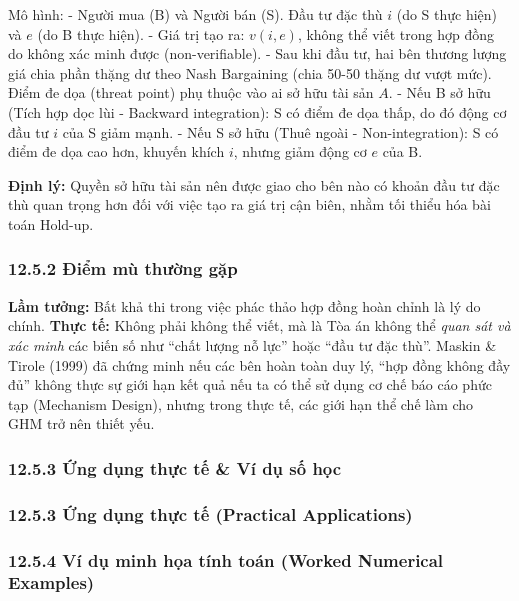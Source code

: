 \documentclass[
]{article}
\begin{document}
Mô hình: - Người mua (B) và Người bán (S). Đầu tư đặc thù \(i\) (do S
thực hiện) và \(e\) (do B thực hiện). - Giá trị tạo ra: \(v(i, e)\),
không thể viết trong hợp đồng do không xác minh được (non-verifiable). -
Sau khi đầu tư, hai bên thương lượng giá chia phần thặng dư theo Nash
Bargaining (chia 50-50 thặng dư vượt mức). Điểm đe dọa (threat point)
phụ thuộc vào ai sở hữu tài sản \(A\). - Nếu B sở hữu (Tích hợp dọc lùi
- Backward integration): S có điểm đe dọa thấp, do đó động cơ đầu tư
\(i\) của S giảm mạnh. - Nếu S sở hữu (Thuê ngoài - Non-integration): S
có điểm đe dọa cao hơn, khuyến khích \(i\), nhưng giảm động cơ \(e\) của
B.

\textbf{Định lý:} Quyền sở hữu tài sản nên được giao cho bên nào có
khoản đầu tư đặc thù quan trọng hơn đối với việc tạo ra giá trị cận
biên, nhằm tối thiểu hóa bài toán Hold-up.

\subsubsection{12.5.2 Điểm mù thường
gặp}\label{ux111iux1ec3m-muxf9-thux1b0ux1eddng-gux1eb7p-4}

\textbf{Lầm tưởng:} Bất khả thi trong việc phác thảo hợp đồng hoàn chỉnh
là lý do chính. \textbf{Thực tế:} Không phải không thể viết, mà là Tòa
án không thể \emph{quan sát và xác minh} các biến số như ``chất lượng nỗ
lực'' hoặc ``đầu tư đặc thù''. Maskin \& Tirole (1999) đã chứng minh nếu
các bên hoàn toàn duy lý, ``hợp đồng không đầy đủ'' không thực sự giới
hạn kết quả nếu ta có thể sử dụng cơ chế báo cáo phức tạp (Mechanism
Design), nhưng trong thực tế, các giới hạn thể chế làm cho GHM trở nên
thiết yếu.

\subsubsection{12.5.3 Ứng dụng thực tế \& Ví dụ số
học}\label{ux1ee9ng-dux1ee5ng-thux1ef1c-tux1ebf-vuxed-dux1ee5-sux1ed1-hux1ecdc-4}

\subsubsection{12.5.3 Ứng dụng thực tế (Practical
Applications)}\label{ux1ee9ng-dux1ee5ng-thux1ef1c-tux1ebf-practical-applications-44}

\subsubsection{12.5.4 Ví dụ minh họa tính toán (Worked Numerical
Examples)}\label{vuxed-dux1ee5-minh-hux1ecda-tuxednh-touxe1n-worked-numerical-examples-36}
\end{document}
